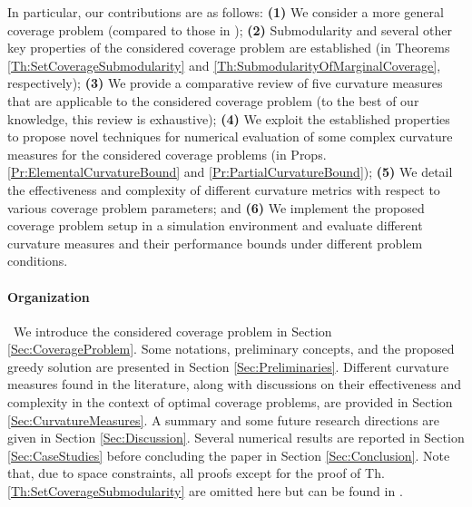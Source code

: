 \documentclass[letterpaper, 10 pt, conference]{ieeeconf}
\begin{document}
In particular, our contributions are as follows: 
\textbf{(1)} We consider a more general coverage problem (compared to those in \cite{WelikalaJ02021,Sun2019});
\textbf{(2)} Submodularity and several other key properties of the considered coverage problem are established (in Theorems \ref{Th:SetCoverageSubmodularity} and \ref{Th:SubmodularityOfMarginalCoverage}, respectively); 
\textbf{(3)} We provide a comparative review of five curvature measures 
that are applicable to the considered coverage problem (to the best of our knowledge, this review is exhaustive);
\textbf{(4)} We exploit the established properties to propose novel techniques for numerical evaluation of some complex curvature measures for the considered coverage problems (in Props. \ref{Pr:ElementalCurvatureBound} and \ref{Pr:PartialCurvatureBound}); 
\textbf{(5)} We detail the effectiveness and complexity
of different curvature metrics with respect to various coverage problem parameters; and 
\textbf{(6)} We implement the proposed coverage problem setup in a simulation environment and evaluate different curvature measures and their performance bounds under different problem conditions.






\paragraph*{Organization}\ 
We introduce the considered coverage problem in Section \ref{Sec:CoverageProblem}. Some notations, preliminary concepts, and the proposed greedy solution are presented in Section \ref{Sec:Preliminaries}. Different curvature measures found in the literature, along with discussions on their effectiveness and complexity in the context of optimal coverage problems, are provided in Section \ref{Sec:CurvatureMeasures}. 
A summary and some future research directions are given in Section \ref{Sec:Discussion}. 
Several numerical results are reported in Section \ref{Sec:CaseStudies} before concluding the paper in Section \ref{Sec:Conclusion}. Note that, due to space constraints, all proofs except for the proof of Th. \ref{Th:SetCoverageSubmodularity} are omitted here but can be found in \cite{Welikala2024Ax1}.
\end{document}
